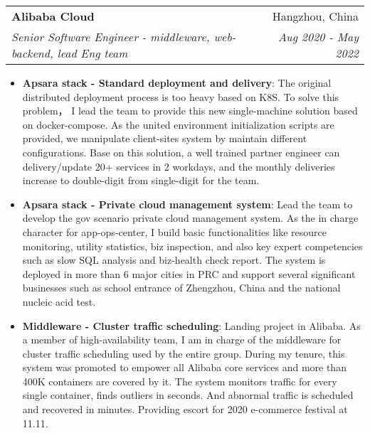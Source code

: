 \documentclass[letterpaper,11pt]{article}
\makeatletter
\newcommand{\resumeItem}[2]{
	\item\small{
		\textbf{#1}{: #2 \vspace{-2pt}}
	}
}
\newcommand{\resumeSubheading}[4]{
	\vspace{-1pt}\item
	\begin{tabular*}{0.97\textwidth}[t]{l@{\extracolsep{\fill}}r}
		\textbf{#1} & #2 \\
		\textit{\small#3} & \textit{\small #4} \\
	\end{tabular*}\vspace{-5pt}
}
\newcommand{\resumeItemListStart}{\begin{itemize}}
\newcommand{\resumeItemListEnd}{\end{itemize}\vspace{-5pt}}
\makeatother
\begin{document}
\begin{spacing}{0.80}
	\resumeSubheading
	{Alibaba Cloud}{Hangzhou, China}
	{Senior Software Engineer - middleware, web-backend, lead Eng team}{Aug 2020 - May 2022}
	\resumeItemListStart
	\resumeItem{Apsara stack - Standard deployment and delivery}
	{The original distributed deployment process is too heavy based on K8S. To solve this problem， I lead the team to provide this new single-machine solution based on docker-compose. As the united environment initialization scripts are provided, we manipulate client-sites system by maintain different configurations. Base on this solution, a well trained partner engineer can delivery/update 20+ services in 2 workdays, and the monthly deliveries increase to double-digit from single-digit for the team.}
	\resumeItem{Apsara stack - Private cloud management system}
	{Lead the team to develop the gov scenario private cloud management system. As the in charge character for app-ops-center, I build basic functionalities like resource monitoring, utility statistics, biz inspection, and also key expert competencies such as slow SQL analysis and biz-health check report. The system is deployed in more than 6 major cities in PRC and support several significant businesses such as school entrance of Zhengzhou, China and the national nucleic acid test.}
	\resumeItem{Middleware - Cluster traffic scheduling}
	{Landing project in Alibaba. As a member of high-availability team, I am in charge of the middleware for cluster traffic scheduling used by the entire group. During my tenure, this system was promoted to empower all Alibaba core services and more than 400K containers are covered by it. The system monitors traffic for every single container, finds outliers in seconds. And abnormal traffic is scheduled and recovered in minutes. Providing escort for 2020 e-commerce festival at 11.11.}
	\resumeItemListEnd
	

\end{spacing}
\end{document}
